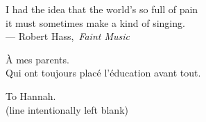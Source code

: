 
\thispagestyle{empty}


\vspace*{3cm}

\begin{center}
    I had the idea that the world's so full of pain \\
	it must sometimes make a kind of singing. \\ \medskip
    --- Robert Hass,\, \emph{Faint Music}    
\end{center}

\bigskip

\begin{center}
    \`A mes parents. \\ \smallskip
    Qui ont toujours plac\'e l'\'education avant tout.
\end{center}

\bigskip

\begin{center}
   To Hannah. \\ \smallskip
   (line intentionally left blank)
\end{center}

